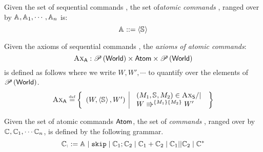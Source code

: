 %
%
\begin{definition}
Given the set of sequential commands \Seqs, the set of\emph{atomic commands} \Atoms, ranged over by $\mathbb{A}_{}, \mathbb{A}_{1}, \cdots, \mathbb{A}_{n}$ is:
%
\[
	\mathbb{A}_{} ::=  \left\langle \mathbb{S}_{} \right\rangle
\]
%
\end{definition}
%
%
\begin{definition}\label{def:atomic-command-axioms}
Given the axioms of sequential commands \AxiomsSeq, the \emph{axioms of atomic commands}:
%
\[
	\textsc{Ax}_{\textsf{A}} : \mathscr{P}\left(\textsf{World} \right) \times \textsf{Atom} \times \mathscr{P}\left(\textsf{World} \right)
\]
%
is defined as follows where we write $W, W', \cdots$ to quantify over the elements of $\mathscr{P}\left(\textsf{World} \right)$.
%
\[
\begin{array}{@{} r @{\hspace{2pt}}l @{}}

	\AxiomsA \eqdef & 
%		
	\left\{ 
	\begin{array}{l | l}
		\left(W, \atomic{\seq{}}, W' \right)	& 
		\begin{array}{l}
			\left(M_1, \seq{}, M_2 \right) \in \AxiomsSeq /| \\ 
			\repartitions{W}{W'}{M_1}{M_2}	
		\end{array}
	\end{array}
	\right\}\\
	
	
\end{array}
\]
%
\end{definition}
%
\begin{definition}
Given the set of atomic commands $\textsf{Atom}$, the set of \colosl \emph{commands} \Coms, ranged over by $\mathbb{C}_{}, \mathbb{C}_{1}, \cdots \mathbb{C}_{n}$, is defined by the following grammar.
\[
	\mathbb{C}_{:}:= \mathbb{A}_{} \mid \mathtt{skip} \mid \mathbb{C}_{1}; \mathbb{C}_{2} \mid \mathbb{C}_{1} + \mathbb{C}_{2} \mid \mathbb{C}_{1} || \mathbb{C}_{2} \mid \mathbb{C}_{}^{*}
\]
\end{definition}
%
%
